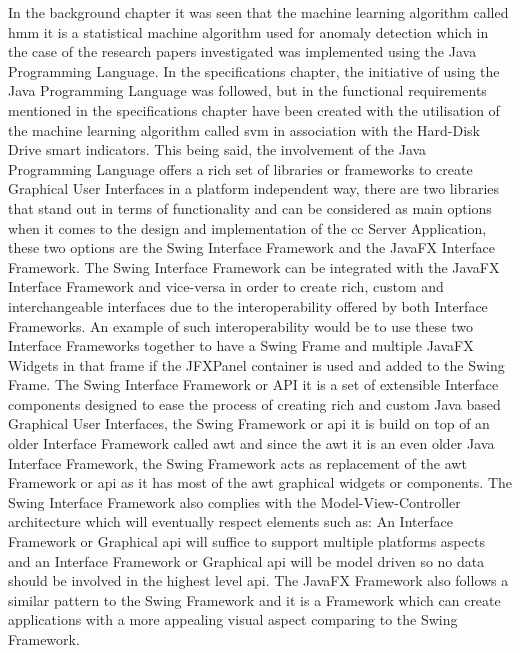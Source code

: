 In the background chapter it was seen that the machine learning algorithm called
\acrfull{hmm} it is a statistical machine algorithm used for anomaly detection
which in the case of the research papers investigated was implemented using the
Java Programming Language. In the specifications chapter, the initiative of using
the Java Programming Language was followed, but in the functional requirements
mentioned in the specifications chapter have been created with the utilisation
of the machine learning algorithm called \acrfull{svm} in association with the
Hard-Disk Drive \acrfull{smart} indicators. This being said, the involvement of
the Java Programming Language offers a rich set of libraries or frameworks
to create Graphical User Interfaces in a platform independent way, there are
two libraries that stand out in terms of functionality and can be considered as
main options when it comes to the design and implementation of the \acrfull{cc}
Server Application, these two options are the Swing Interface Framework and the
JavaFX Interface Framework. The Swing Interface Framework can be integrated with
the JavaFX Interface Framework and vice-versa in order to create rich, custom
and interchangeable interfaces due to the interoperability offered by both
Interface Frameworks. An example of such interoperability would be to use
these two Interface Frameworks together to have a Swing Frame and multiple
JavaFX Widgets in that frame if the JFXPanel container is used and added
to the Swing Frame. The Swing Interface Framework or API it is a set of
extensible Interface components designed to ease the process of creating
rich and custom Java based Graphical User Interfaces, the Swing Framework
or \acrfull{api} it is build on top of an older Interface Framework called
\acrfull{awt} and since the \acrfull{awt} it is an even older Java Interface
Framework, the Swing Framework acts as replacement of the \acrfull{awt}
Framework or \acrfull{api} as it has most of the \acrfull{awt} graphical
widgets or components. The Swing Interface Framework also complies with
the Model-View-Controller architecture which will eventually respect
elements such as: An Interface Framework or Graphical \acrfull{api} will
suffice to support multiple platforms aspects and an Interface Framework
or Graphical \acrfull{api} will be model driven so no data should be
involved in the highest level \acrfull{api}. The JavaFX Framework also
follows a similar pattern to the Swing Framework and it is a Framework
which can create applications with a more appealing visual aspect comparing
to the Swing Framework.
